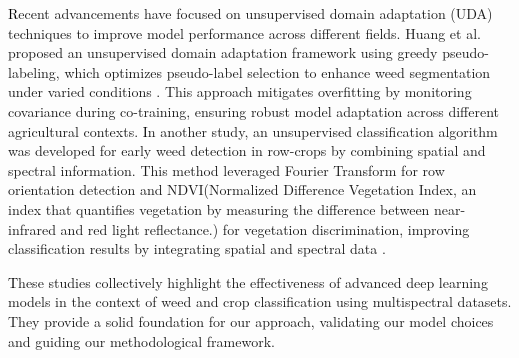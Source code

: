 \textcolor{black}Recent advancements have focused on unsupervised domain adaptation (UDA) techniques to improve model performance across different fields. Huang et al. \cite{huang2024unsupervised} proposed an unsupervised domain adaptation framework using greedy pseudo-labeling, which optimizes pseudo-label selection to enhance weed segmentation under varied conditions . This approach mitigates overfitting by monitoring covariance during co-training, ensuring robust model adaptation across different agricultural contexts.
\textcolor{black}In another study, an unsupervised classification algorithm was developed for early weed detection in row-crops by combining spatial and spectral information. This method leveraged Fourier Transform for row orientation detection and NDVI(Normalized Difference Vegetation Index, an index that quantifies vegetation by measuring the difference between near-infrared and red light reflectance.) for vegetation discrimination, improving classification results by integrating spatial and spectral data \cite{mendoza2022cnn}.

\textcolor{black}These studies collectively highlight the effectiveness of advanced deep learning models in the context of weed and crop classification using multispectral datasets. They provide a solid foundation for our approach, validating our model choices and guiding our methodological framework.

\vspace{-1mm}